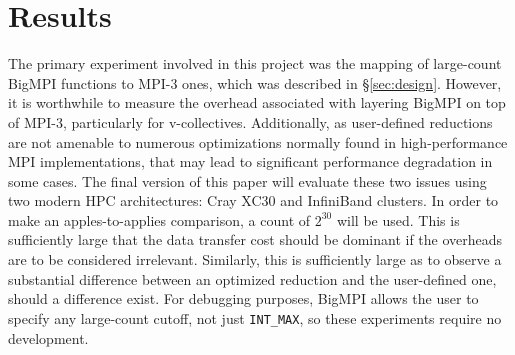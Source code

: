 
\section{Results}

The primary experiment involved in this project was the
mapping of large-count BigMPI functions to MPI-3 ones,
which was described in \S\ref{sec:design}.
However, it is worthwhile to measure the overhead associated
with layering BigMPI on top of MPI-3, particularly for v-collectives.
Additionally, as user-defined reductions are not amenable to numerous
optimizations normally found in high-performance MPI implementations,
that may lead to significant performance degradation in some cases.
The final version of this paper will evaluate these two issues
using two modern HPC architectures: Cray XC30 and InfiniBand clusters.
In order to make an apples-to-applies comparison, a count
of $2^{30}$ will be used.  This is sufficiently large that the data transfer
cost should be dominant if the overheads are to be considered irrelevant.
Similarly, this is sufficiently large as to observe a substantial difference 
between an optimized reduction and the user-defined one, should a
difference exist.
For debugging purposes, BigMPI allows the user to specify any
large-count cutoff, not just \texttt{INT\_MAX}, so these experiments
require no development.